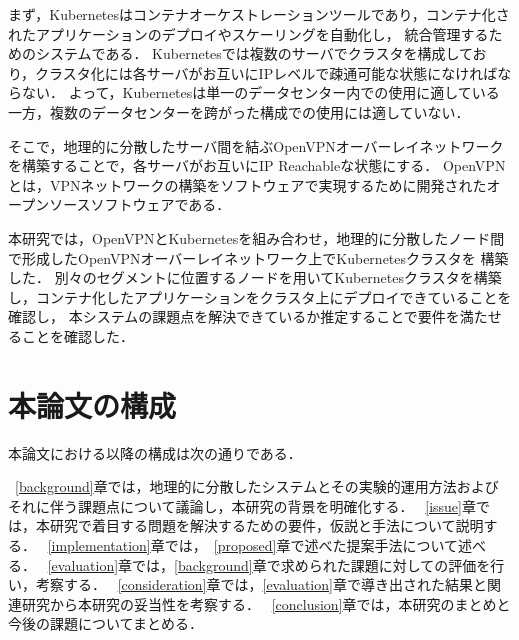 まず，Kubernetesはコンテナオーケストレーションツールであり，コンテナ化されたアプリケーションのデプロイやスケーリングを自動化し，
統合管理するためのシステムである．
Kubernetesでは複数のサーバでクラスタを構成しており，クラスタ化には各サーバがお互いにIPレベルで疎通可能な状態になければならない．
よって，Kubernetesは単一のデータセンター内での使用に適している一方，複数のデータセンターを跨がった構成での使用には適していない．

そこで，地理的に分散したサーバ間を結ぶOpenVPNオーバーレイネットワークを構築することで，各サーバがお互いにIP Reachableな状態にする．
OpenVPNとは，VPNネットワークの構築をソフトウェアで実現するために開発されたオープンソースソフトウェアである．

本研究では，OpenVPNとKubernetesを組み合わせ，地理的に分散したノード間で形成したOpenVPNオーバーレイネットワーク上でKubernetesクラスタを
構築した．
別々のセグメントに位置するノードを用いてKubernetesクラスタを構築し，コンテナ化したアプリケーションをクラスタ上にデプロイできていることを確認し，
本システムの課題点を解決できているか推定することで要件を満たせることを確認した．

\section{本論文の構成}
\label{introduction:structure}

本論文における以降の構成は次の通りである．

~\ref{background}章では，地理的に分散したシステムとその実験的運用方法およびそれに伴う課題点について議論し，本研究の背景を明確化する．
~\ref{issue}章では，本研究で着目する問題を解決するための要件，仮説と手法について説明する．
~\ref{implementation}章では，~\ref{proposed}章で述べた提案手法について述べる．
~\ref{evaluation}章では，\ref{background}章で求められた課題に対しての評価を行い，考察する．
~\ref{consideration}章では，\ref{evaluation}章で導き出された結果と関連研究から本研究の妥当性を考察する．
~\ref{conclusion}章では，本研究のまとめと今後の課題についてまとめる．

